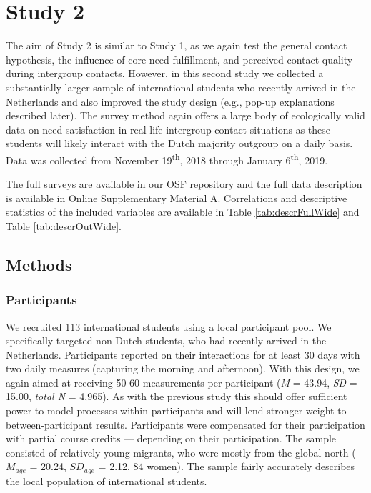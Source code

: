 \section{Study 2}

The aim of Study 2 is similar to Study 1, as we again test the general
contact hypothesis, the influence of core need fulfillment, and
perceived contact quality during intergroup contacts. However, in this
second study we collected a substantially larger sample of international
students who recently arrived in the Netherlands and also improved the
study design (e.g., pop-up explanations described later). The survey
method again offers a large body of ecologically valid data on need
satisfaction in real-life intergroup contact situations as these
students will likely interact with the Dutch majority outgroup on a
daily basis. Data was collected from November 19\textsuperscript{th},
2018 through January 6\textsuperscript{th}, 2019.

The full surveys are available in our OSF repository
\citep{KreienkampMasked2022a} and the full data description is available
in Online Supplementary Material A. Correlations and descriptive
statistics of the included variables are available in Table
\ref{tab:descrFullWide} and Table \ref{tab:descrOutWide}.

\subsection{Methods}

\subsubsection{Participants}

We recruited 113 international students using a local participant pool.
We specifically targeted non-Dutch students, who had recently arrived in
the Netherlands. Participants reported on their interactions for at
least 30 days with two daily measures (capturing the morning and
afternoon). With this design, we again aimed at receiving 50-60
measurements per participant (\textit{M} = 43.94, \textit{SD} = 15.00,
\textit{total N} = 4,965). As with the previous study this should offer
sufficient power to model processes within participants and will lend
stronger weight to between-participant results. Participants were
compensated for their participation with partial course credits ---
depending on their participation. The sample consisted of relatively
young migrants, who were mostly from the global north (\(M_{age}\) =
20.24, \(SD_{age}\) = 2.12, 84 women). The sample fairly accurately
describes the local population of international students.

